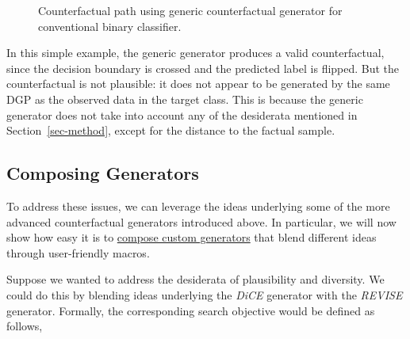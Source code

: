 \documentclass{juliacon}
\begin{document}
\begin{figure}


\caption{\label{fig-binary}Counterfactual path using generic
counterfactual generator for conventional binary classifier.}

\end{figure}%

In this simple example, the generic generator produces a valid
counterfactual, since the decision boundary is crossed and the predicted
label is flipped. But the counterfactual is not plausible: it does not
appear to be generated by the same DGP as the observed data in the
target class. This is because the generic generator does not take into
account any of the desiderata mentioned in Section~\ref{sec-method},
except for the distance to the factual sample.

\subsection{Composing Generators}\label{sec-gen-comp}

To address these issues, we can leverage the ideas underlying some of
the more advanced counterfactual generators introduced above. In
particular, we will now show how easy it is to
\href{https://juliatrustworthyai.github.io/CounterfactualExplanations.jl/v0.1/tutorials/generators/}{compose
custom generators} that blend different ideas through user-friendly
macros.

Suppose we wanted to address the desiderata of plausibility and
diversity. We could do this by blending ideas underlying the \emph{DiCE}
generator with the \emph{REVISE} generator. Formally, the corresponding
search objective would be defined as follows,
\end{document}
